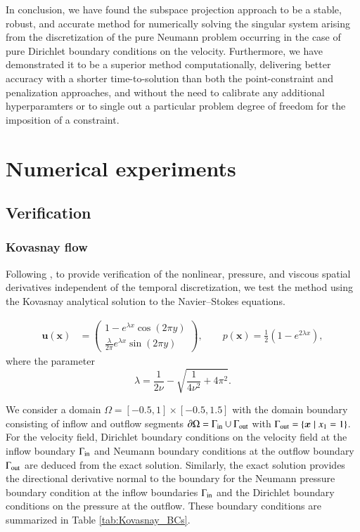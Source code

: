 In conclusion, we have found the subspace projection approach to be a stable, robust, and accurate method for numerically solving the singular system arising from the discretization of the pure Neumann problem occurring in the case of pure Dirichlet boundary conditions on the velocity.
Furthermore, we have demonstrated it to be a superior method computationally, delivering better accuracy with a shorter time-to-solution than both the point-constraint and penalization approaches, and without the need to calibrate any additional hyperparamters or to single out a particular problem degree of freedom for the imposition of a constraint.

\section{Numerical experiments} \label{sec:numerical_experiments}

\subsection{Verification}

\subsubsection{Kovasnay flow}%
\label{ssub:kovasnay_flow}


Following \cite{hesthaven_nodal_2008}, to provide verification of the nonlinear, pressure, and viscous spatial derivatives independent of the temporal discretization, we test the method using the Kovasnay analytical solution to the Navier--Stokes equations.

\begin{equation}
  \begin{aligned}
    \bm{u(\bm{x})} &= 
    \begin{pmatrix}
      1 - e^{\lambda x} \cos(2 \pi y) \\
      \frac{\lambda}{2\pi} e^{\lambda x} \sin(2\pi y)
    \end{pmatrix}, \qquad
    p(\bm{x}) = \frac{1}{2} \left(1 - e^{2\lambda x}\right),
  \end{aligned}
  \label{eq:kovasnay_flow}
\end{equation}
where the parameter 
\begin{equation}
\lambda = \frac{1}{2\nu} - \sqrt{\frac{1}{4\nu^2} + 4\pi^2}.
\end{equation}

We consider a domain $\Omega = [-0.5,1]\times [-0.5, 1.5]$ with the domain boundary consisting of inflow and outflow segments $\partial\Omega = \Gamma_{\text{in}}\cup \Gamma_{\text{out}}$ with $\Gamma_{\text{out}} = \left\{\bm{x}\mid x_1 = 1\right\}$. 
For the velocity field, Dirichlet boundary conditions on the velocity field at the inflow boundary $\Gamma_{\text{in}}$ and Neumann boundary conditions at the outflow boundary $\Gamma_{\text{out}}$ are deduced from the exact solution. 
Similarly, the exact solution provides the directional derivative normal to the boundary for the Neumann pressure boundary condition at the inflow boundaries $\Gamma_{\text{in}}$ and the Dirichlet boundary conditions on the pressure at the outflow. 
These boundary conditions are summarized in Table \ref{tab:Kovasnay_BCs}. \\

